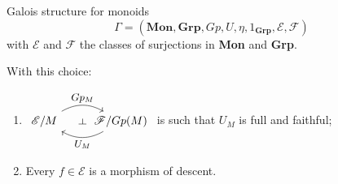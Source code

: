 \documentclass[4pt]{beamer}
\newtheorem{defi}[teo]{Definition}
\newcommand{\pullback}{|[label={[label distance=-2mm]-45:\lrcorner}]|}
\begin{document}
\begin{frame}{Galois structure for monoids}
    \[ \Gamma = (\textbf{Mon}, \textbf{Grp}, Gp, U, \eta, 1_{\textbf{Grp}}, \mathscr{E}, \mathscr{F}) \]
    with $\mathscr{E}$ and $\mathscr{F}$ the classes of surjections in \textbf{Mon} and \textbf{Grp}.

    \vspace{3mm}

    With this choice:
    
    \vspace{1mm}
    
    \begin{enumerate}
        \item $\begin{tikzcd}[every label/.append style = {font = \small}, ampersand replacement=\&]
            \mathscr{E}/M \arrow[r, bend left, "Gp_M", ""{name=GpM}] \& \mathscr{F}/Gp(M) \arrow[l, bend left, "U_M", ""{name=UM}] \arrow[phantom, from=GpM, to=UM, "\dashv" rotate=-90]
        \end{tikzcd}$ is such that $U_M$ is full and faithful;
        \item Every $f\in\mathscr{E}$ is a morphism of descent.
    \end{enumerate}
\end{frame}

\end{document}
